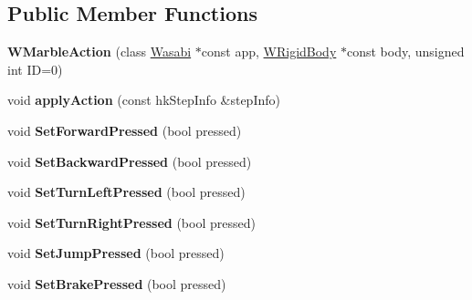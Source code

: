 \subsection*{Public Member Functions}
\begin{DoxyCompactItemize}
\item 
{\bfseries W\+Marble\+Action} (class \hyperlink{class_wasabi}{Wasabi} $\ast$const app, \hyperlink{class_w_rigid_body}{W\+Rigid\+Body} $\ast$const body, unsigned int ID=0)\hypertarget{class_w_marble_action_a0c3da13df96d650bc49e72029a426f81}{}\label{class_w_marble_action_a0c3da13df96d650bc49e72029a426f81}

\item 
void {\bfseries apply\+Action} (const hk\+Step\+Info \&step\+Info)\hypertarget{class_w_marble_action_a38afd07ee30429279759ab7fd6f0c381}{}\label{class_w_marble_action_a38afd07ee30429279759ab7fd6f0c381}

\item 
void {\bfseries Set\+Forward\+Pressed} (bool pressed)\hypertarget{class_w_marble_action_a3e148ecb1505df538f9106e2d41a3656}{}\label{class_w_marble_action_a3e148ecb1505df538f9106e2d41a3656}

\item 
void {\bfseries Set\+Backward\+Pressed} (bool pressed)\hypertarget{class_w_marble_action_aa06bbbcc6bb19aa8cba3f04498085935}{}\label{class_w_marble_action_aa06bbbcc6bb19aa8cba3f04498085935}

\item 
void {\bfseries Set\+Turn\+Left\+Pressed} (bool pressed)\hypertarget{class_w_marble_action_a110d2dcad3a695aee54604a2abf2c3d2}{}\label{class_w_marble_action_a110d2dcad3a695aee54604a2abf2c3d2}

\item 
void {\bfseries Set\+Turn\+Right\+Pressed} (bool pressed)\hypertarget{class_w_marble_action_aa63d0d2a94fe8bfbad21e0854c1570f9}{}\label{class_w_marble_action_aa63d0d2a94fe8bfbad21e0854c1570f9}

\item 
void {\bfseries Set\+Jump\+Pressed} (bool pressed)\hypertarget{class_w_marble_action_a4ad398c66e8a6a53ac39de46e701cdb9}{}\label{class_w_marble_action_a4ad398c66e8a6a53ac39de46e701cdb9}

\item 
void {\bfseries Set\+Brake\+Pressed} (bool pressed)\hypertarget{class_w_marble_action_a6188a6f4c3dd1580eb338a237c6c3cb0}{}\label{class_w_marble_action_a6188a6f4c3dd1580eb338a237c6c3cb0}


\end{DoxyCompactItemize}
